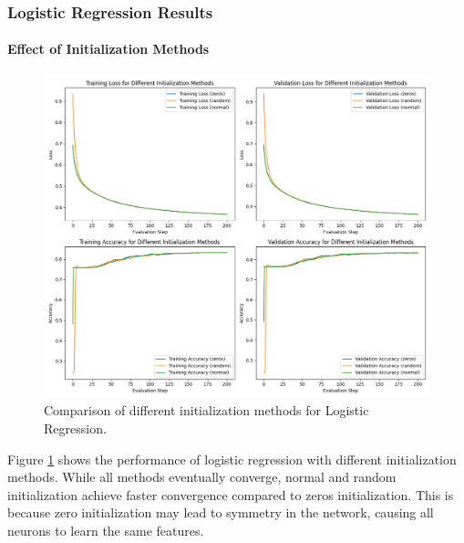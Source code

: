 \documentclass[journal, a4paper]{IEEEtran}
\begin{document}
\subsubsection{Logistic Regression Results}
\paragraph{Effect of Initialization Methods}
\begin{figure}[htbp]
\centering
\includegraphics[width=\linewidth]{logistic_regression_init_methods.png}
\caption{Comparison of different initialization methods for Logistic Regression.}
\label{fig:lr_init}
\end{figure}

Figure \ref{fig:lr_init} shows the performance of logistic regression with different initialization methods. While all methods eventually converge, normal and random initialization achieve faster convergence compared to zeros initialization. This is because zero initialization may lead to symmetry in the network, causing all neurons to learn the same features.
\end{document}
